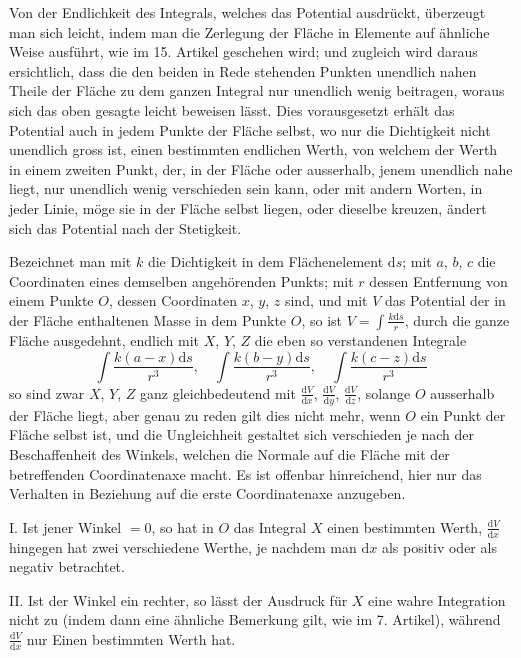 \expandafter\def\csname HistoricalNoteText22\endcsname{Von der Endlichkeit des Integrals, welches das Potential ausdrückt, überzeugt man sich leicht, indem man die Zerlegung der Fläche in Elemente auf ähnliche Weise ausführt, wie im 15. Artikel geschehen wird; und zugleich wird daraus ersichtlich, dass die den beiden in Rede stehenden Punkten unendlich nahen Theile der Fläche zu dem ganzen Integral nur unendlich wenig beitragen, woraus sich das oben gesagte leicht beweisen lässt.}%
Dies vorausgesetzt erhält das Potential auch in jedem Punkte der Fläche selbst, wo nur die Dichtigkeit nicht unendlich gross ist, einen bestimmten endlichen Werth, von welchem der Werth in einem zweiten Punkt, der, in der Fläche oder ausserhalb, jenem unendlich nahe liegt, nur unendlich wenig verschieden sein kann, oder mit andern Worten, in jeder Linie, möge sie in der Fläche selbst liegen, oder dieselbe kreuzen, ändert sich das Potential nach der Stetigkeit.

Bezeichnet man mit $k$ die Dichtigkeit in dem Flächenelement $\mathrm{d}s$; mit
%
$a$, $b$, $c$ die Coordinaten eines demselben angehörenden Punkts; mit $r$ dessen Entfernung von einem Punkte $O$, dessen Coordinaten $x$, $y$, $z$ sind, und mit $V$ das Potential der in der Fläche enthaltenen Masse in dem Punkte $O$, so ist $V=\int\frac{k\mathrm{d}s}{r}$, durch die ganze Fläche ausgedehnt, endlich mit $X$, $Y$, $Z$ die eben so verstandenen Integrale
\[
\int\frac{k(a-x)\mathrm{d}s}{r^3},\quad\int\frac{k(b-y)\mathrm{d}s}{r^3},\quad\int\frac{k(c-z)\mathrm{d}s}{r^3}
\]
so sind zwar $X$, $Y$, $Z$ ganz gleichbedeutend mit $\frac{\mathrm{d}V}{\mathrm{d}x}$, $\frac{\mathrm{d}V}{\mathrm{d}y}$, $\frac{\mathrm{d}V}{\mathrm{d}z}$, solange $O$ ausserhalb der Fläche liegt, aber genau zu reden gilt dies nicht mehr, wenn $O$ ein Punkt der Fläche selbst ist, und die Ungleichheit gestaltet sich verschieden je nach der Beschaffenheit des Winkels, welchen die Normale auf die Fläche mit der betreffenden Coordinatenaxe macht. Es ist offenbar hinreichend, hier nur das Verhalten in Beziehung auf die erste Coordinatenaxe anzugeben.

I. Ist jener Winkel $=0$, so hat in $O$ das Integral $X$ einen bestimmten Werth, $\frac{\mathrm{d}V}{\mathrm{d}x}$ hingegen hat zwei verschiedene Werthe, je nachdem man $\mathrm{d}x$ als positiv oder als negativ betrachtet.

II. Ist der Winkel ein rechter, so lässt der Ausdruck für $X$ eine wahre Integration nicht zu (indem dann eine ähnliche Bemerkung gilt, wie im 7. Artikel), während $\frac{\mathrm{d}V}{\mathrm{d}x}$ nur Einen bestimmten Werth hat.

